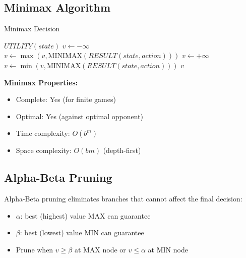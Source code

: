 \documentclass[11pt,letterpaper]{article}
\begin{document}
\subsection{Minimax Algorithm}

\begin{algorithm}
\caption{Minimax Decision}
\begin{algorithmic}[1]
        \State \Return $UTILITY(state)$
    \EndIf
        \State $v \gets -\infty$
            \State $v \gets \max(v, \text{MINIMAX}(RESULT(state, action)))$
        \EndFor
    \Else
        \State $v \gets +\infty$
            \State $v \gets \min(v, \text{MINIMAX}(RESULT(state, action)))$
        \EndFor
    \EndIf
    \State \Return $v$
\EndFunction
\end{algorithmic}
\end{algorithm}

\begin{important}
\textbf{Minimax Properties:}
\begin{itemize}
    \item Complete: Yes (for finite games)
    \item Optimal: Yes (against optimal opponent)
    \item Time complexity: $O(b^m)$
    \item Space complexity: $O(bm)$ (depth-first)
\end{itemize}
\end{important}

\subsection{Alpha-Beta Pruning}

\begin{concept}
Alpha-Beta pruning eliminates branches that cannot affect the final decision:
\begin{itemize}
    \item $\alpha$: best (highest) value MAX can guarantee
    \item $\beta$: best (lowest) value MIN can guarantee
    \item Prune when $v \geq \beta$ at MAX node or $v \leq \alpha$ at MIN node
\end{itemize}
\end{concept}
\end{document}
